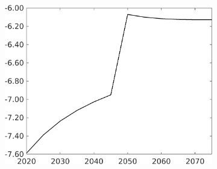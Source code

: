 \begin{figure}[h!!]
\begin{subfigure}{0.7\textwidth}
\begin{minipage}[]{0.45\textwidth}
			\includegraphics[width=1\textwidth]{../../codding_model/own_basedOnFried/optimalPol_010922_revision/figures/all_13Sept22/CompTaufPER_bytaul_Equlab_Reg0_tauf_spillover0_nsk0_xgr0_knspil0_sep0_LFlimit1_emsbase0_countec0_GovRev0_etaa0.79_lgd0.png} 
		\end{minipage}	
	\end{subfigure}
	

\end{figure}

